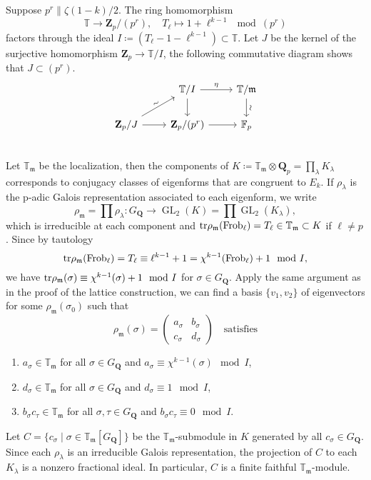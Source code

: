 \documentclass[11pt]{amsart}
\newcommand{\Q}{\mathbf{Q}}  %
\newcommand{\Z}{\mathbf{Z}}  %
\newcommand{\tr}{{\rm tr}} %
\newcommand{\gl}{\operatorname{GL}}
\newcommand{\frob}{\operatorname{Frob}}
\newcommand{\mat}[1]{ \begin{pmatrix}
#1
\end{pmatrix} }
\theoremstyle{definition}
\theoremstyle{definition}
\theoremstyle{definition}
\theoremstyle{definition}
\theoremstyle{definition}
\theoremstyle{definition}
\begin{document}
Suppose $p^r\parallel\zeta(1-k)/2$. The ring homomorphism
\begin{equation*}
    \mathbb{T}\to \Z_p/(p^r),\quad T_\ell\mapsto 1+\ell^{k-1}\mod (p^r)
\end{equation*}
factors through the ideal $I\coloneqq(T_\ell-1-\ell^{k-1})\subset \mathbb{T}$. 
Let $J$ be the kernel of the surjective homomorphism
$\Z_p\to\mathbb{T}/I$, the following commutative diagram
shows that $J\subset (p^r)$.
\begin{equation*}
    \begin{tikzcd}
        & \mathbb{T} \arrow[r,"\eta"]\arrow[d]/I & \mathbb{T}/\mathfrak{m}\arrow[d,"\sim",sloped]\\
         \Z_p/J \arrow[r] \arrow[ur,"\sim",sloped] &\Z_p/(p^r) \arrow[r]& \mathbb{F}_p\\
    \end{tikzcd}
\end{equation*}
Let $\mathbb{T}_\mathfrak{m}$ be the localization, then the components of $K\coloneqq \mathbb{T}_\mathfrak{m}\otimes\Q_p=\prod_\lambda K_\lambda$
corresponds to conjugacy classes of eigenforms that are congruent to $E_k$.
If $\rho_\lambda$ is the p-adic Galois representation associated to each eigenform, we write
\begin{equation*}
    \rho_\mathfrak{m}=\prod \rho_\lambda \colon G_\Q\to \gl_2(K)=\prod \gl_2(K_\lambda),
\end{equation*}
which is irreducible at each component and 
$\tr\rho_\mathfrak{m}(\frob_\ell)=T_\ell\in \mathbb{T}_\mathfrak{m}\subset K$ if $\ell\neq p$. Since by tautology
\begin{equation*}
    \tr\rho_\mathfrak{m}(\frob_\ell)=T_\ell \equiv \ell^{k-1}+1=\chi^{k-1}(\frob_\ell)+1\mod I,
\end{equation*}
we have $\tr\rho_\mathfrak{m}(\sigma)\equiv \chi^{k-1}(\sigma)+1\mod I$
for $\sigma\in G_\Q$.
Apply the same argument as in the proof of the lattice construction, we can
find a basis $\{v_1,v_2\}$ of eigenvectors for some $\rho_\mathfrak{m}(\sigma_0)$ such that 
\begin{equation*}
    \rho_\mathfrak{m}(\sigma)=\mat{a_\sigma & b_\sigma\\c_\sigma & d_\sigma}\quad
    \text{satisfies}
\end{equation*}
\begin{enumerate}
    \item $a_\sigma\in \mathbb{T}_\mathfrak{m}$ for all $\sigma\in G_\Q$ and $a_\sigma\equiv \chi^{k-1}(\sigma)\mod I$,
    \item $d_\sigma \in \mathbb{T}_\mathfrak{m}$ for all $\sigma\in G_\Q$ and $d_\sigma\equiv 1\mod I$,
    \item $b_\sigma c_\tau\in \mathbb{T}_\mathfrak{m}$
    for all $\sigma, \tau\in G_\Q$ and $b_\sigma c_\tau\equiv 0\mod I$.
\end{enumerate}
Let $C=\{c_\sigma\mid \sigma\in \mathbb{T}_\mathfrak{m}[G_\Q]\}$
be the $\mathbb{T}_\mathfrak{m}$-submodule in $K$
generated by all $c_\sigma\in G_\Q$.
Since each $\rho_\lambda$ is an irreducible Galois representation,
the projection of $C$ to each $K_\lambda$ is a nonzero fractional ideal.
In particular, $C$ is a finite faithful $\mathbb{T}_\mathfrak{m}$-module.
\end{document}
